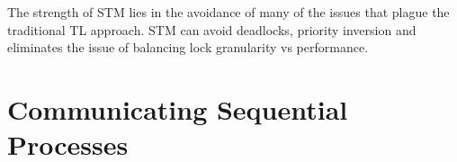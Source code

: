 The strength of \ac{STM} lies in the avoidance of many of the issues that plague the traditional \ac{TL} approach. \ac{STM} can avoid deadlocks, priority inversion and eliminates the issue of balancing lock granularity vs performance\cite[p. 1]{harris2005composable}.

\section{Communicating Sequential Processes}

\worksheetend

